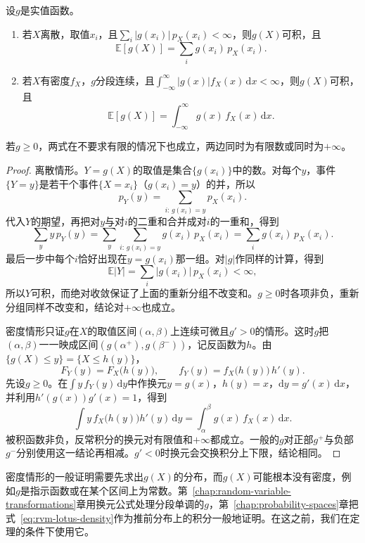 \begin{theorem}[函数的期望]
\label{thm:rvm-lotus}
设$g$是实值函数。
\begin{enumerate}
 \item 若$X$离散，取值$x_i$，且$\sum_i\lvert g(x_i)\rvert\,p_X(x_i)<\infty$，则$g(X)$可积，且
 \begin{equation}
  \mathbb{E}[g(X)]=\sum_{i}g(x_i)\,p_X(x_i) .
  \label{eq:rvm-lotus-discrete}
 \end{equation}
 \item 若$X$有密度$f_X$，$g$分段连续，且$\int_{-\infty}^{\infty}\lvert g(x)\rvert f_X(x)\,\mathrm{d}x<\infty$，则$g(X)$可积，且
 \begin{equation}
  \mathbb{E}[g(X)]=\int_{-\infty}^{\infty}g(x)\,f_X(x)\,\mathrm{d}x .
  \label{eq:rvm-lotus-density}
 \end{equation}
\end{enumerate}
若$g\geq0$，两式在不要求有限的情况下也成立，两边同时为有限数或同时为$+\infty$。
\end{theorem}

\begin{proof}
离散情形。$Y=g(X)$的取值是集合$\{g(x_i)\}$中的数。对每个$y$，事件$\{Y=y\}$是若干个事件$\{X=x_i\}$（$g(x_i)=y$）的并，所以
\[
 p_Y(y)=\sum_{i:\,g(x_i)=y}p_X(x_i) .
\]
代入$Y$的期望，再把对$y$与对$i$的二重和合并成对$i$的一重和，得到
\[
 \sum_{y}y\,p_Y(y)=\sum_{y}\sum_{i:\,g(x_i)=y}g(x_i)\,p_X(x_i)=\sum_{i}g(x_i)\,p_X(x_i) .
\]
最后一步中每个$i$恰好出现在$y=g(x_i)$那一组。对$\lvert g\rvert$作同样的计算，得到
\[
 \mathbb{E}\lvert Y\rvert=\sum_i\lvert g(x_i)\rvert\,p_X(x_i)<\infty,
\]
所以$Y$可积，而绝对收敛保证了上面的重新分组不改变和。$g\geq0$时各项非负，重新分组同样不改变和，结论对$+\infty$也成立。

密度情形只证$g$在$X$的取值区间$(\alpha,\beta)$上连续可微且$g'>0$的情形。这时$g$把$(\alpha,\beta)$一一映成区间$(g(\alpha^{+}),g(\beta^{-}))$，记反函数为$h$。由$\{g(X)\leq y\}=\{X\leq h(y)\}$，
\[
 F_Y(y)=F_X\bigl(h(y)\bigr),\qquad f_Y(y)=f_X\bigl(h(y)\bigr)\,h'(y) .
\]
先设$g\geq0$。在$\int y\,f_Y(y)\,\mathrm{d}y$中作换元$y=g(x)$，$h(y)=x$，$\mathrm{d}y=g'(x)\,\mathrm{d}x$，并利用$h'(g(x))g'(x)=1$，得到
\[
 \int y\,f_X\bigl(h(y)\bigr)h'(y)\,\mathrm{d}y=\int_{\alpha}^{\beta}g(x)\,f_X(x)\,\mathrm{d}x .
\]
被积函数非负，反常积分的换元对有限值和$+\infty$都成立。一般的$g$对正部$g^{+}$与负部$g^{-}$分别使用这一结论再相减。$g'<0$时换元会交换积分上下限，结论相同。
\end{proof}

密度情形的一般证明需要先求出$g(X)$的分布，而$g(X)$可能根本没有密度，例如$g$是指示函数或在某个区间上为常数。第~\ref{chap:random-variable-transformations}章用换元公式处理分段单调的$g$，第~\ref{chap:probability-spaces}章把式~\eqref{eq:rvm-lotus-density}作为推前分布上的积分一般地证明。在这之前，我们在定理的条件下使用它。

